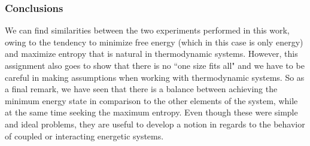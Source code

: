 \documentclass[a4paper, 12pt, notitlepage]{article}
\begin{document}
\subsubsection*{Conclusions}
We can find similarities between the two experiments performed in this work, owing to the tendency to minimize free energy (which in this case is only energy) and maximize entropy that is natural in thermodynamic systems. However, this assignment also goes to show that there is no ``one size fits all" and we have to be careful in making assumptions when working with thermodynamic systems. So as a final remark, we have seen that there is a balance between achieving the minimum energy state in comparison to the other elements of the system, while at the same time seeking the maximum entropy. Even though these were simple and ideal problems, they are useful to develop a notion in regards to the behavior of coupled or interacting energetic systems.
\end{document}
